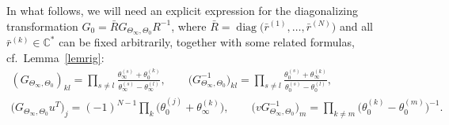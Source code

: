 \documentclass[pdftex]{sigma}
\newcommand\Cb{\mathbb{C}}
\numberwithin{equation}{section}
\begin{document}
In what follows, we will need an explicit expression for the diagonalizing transformation $G_0=\bar R G_{\Theta_\infty,\Theta_0} R^{-1}$, where $\bar R=\operatorname{diag}\big(\bar r^{(1)},\ldots,\bar r^{(N)}\big)$ and all $\bar r^{(k)}\in\Cb^*$ can be fixed arbitrarily, together with some related formulas, cf.\ Lemma~\ref{lemrig}:
\begin{gather}
( G_{\Theta_\infty,\Theta_0})_{kl}= \prod_{s\ne l}\frac{\theta^{(s)}_\infty+\theta^{(k)}_0}{\theta^{(s)}_\infty-\theta^{(l)}_\infty} , \qquad
\big( G_{\Theta_\infty,\Theta_0}^{-1}\big)_{kl}= \prod_{s\ne l}\frac{\theta^{(s)}_0+\theta^{(k)}_\infty}{\theta^{(s)}_0-\theta^{(l)}_0} ,\nonumber\\
\big(G_{\Theta_\infty,\Theta_0}u^T\big)_j=(-1)^{N-1} \prod_{k}\big(\theta^{(j)}_0+\theta^{(k)}_\infty\big), \qquad
\big(v G_{\Theta_\infty,\Theta_0}^{-1}\big)_m = \prod_{k\ne m}\big( \theta^{(k)}_0-\theta^{(m)}_0\big)^{-1}.\label{exprG0}
\end{gather}
\end{document}
